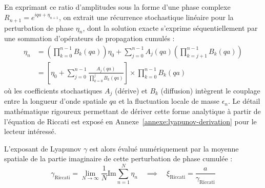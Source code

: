 En exprimant ce ratio d'amplitudes sous la forme d'une phase complexe $R_{n+1} = e^{iqa + \eta_{n+1}}$, on extrait une récurrence stochastique linéaire pour la perturbation de phase $\eta_n$, dont la solution exacte s'exprime séquentiellement par une sommation d'opérateurs de propagation cumulés :
\begin{align*}
    \eta_n &= \left( \prod_{k=0}^{n-1} B_k(qa) \right) \eta_0 + \sum_{j=0}^{n-1} A_j(qa) \left( \prod_{k=j+1}^{n-1} B_k(qa) \right) \\
    &= \left[ \eta_0 + \sum_{j=0}^{n-1} \frac{A_j(qa)}{\prod_{k=0}^{j} B_k(qa)} \right] \times \prod_{k=0}^{n-1} B_k(qa)
\end{align*}
où les coefficients stochastiques $A_j$ (dérive) et $B_k$ (diffusion) intègrent le couplage entre la longueur d'onde spatiale $qa$ et la fluctuation locale de masse $\epsilon_n$. Le détail mathématique rigoureux permettant de dériver cette forme analytique à partir de l'équation de Riccati est exposé en Annexe~\ref{annexe:lyapunov-derivation} pour le lecteur intéressé.

L'exposant de Lyapunov $\gamma$ est alors évalué numériquement par la moyenne spatiale de la partie imaginaire de cette perturbation de phase cumulée :
\begin{equation}
    \gamma_{\text{Riccati}} = \lim_{N \to \infty} \frac{1}{N} \text{Im} \sum_{n=1}^N \eta_n \quad \implies \quad \xi_{\text{Riccati}} = \frac{a}{\gamma_{\text{Riccati}}}
    \label{eq:riccati_lyapunov}
\end{equation}

